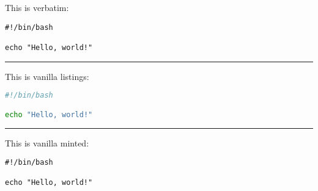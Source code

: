 \documentclass{article}
\begin{document}
\begin{center}

This is verbatim:

\begin{verbatim}
#!/bin/bash

echo "Hello, world!"
\end{verbatim}

\hrule
\vspace{6pt}

This is vanilla {\ttfamily listings}:

\begin{lstlisting}[language=Bash]
#!/bin/bash

echo "Hello, world!"
\end{lstlisting}

\hrule
\vspace{6pt}

This is vanilla {\ttfamily minted}:

\begin{verbatim}
#!/bin/bash

echo "Hello, world!"
\end{verbatim}
\end{center}
\end{document}

